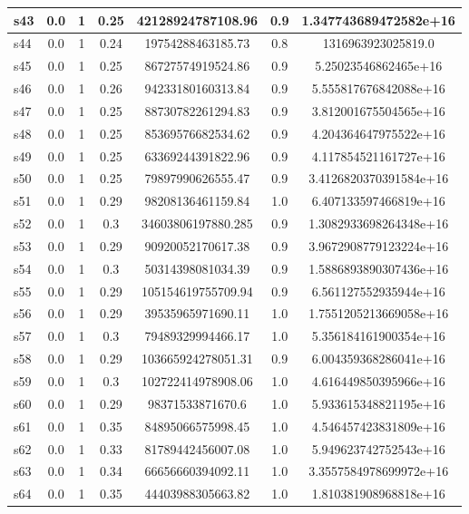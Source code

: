 \documentclass{article}
\begin{document}
\begin{tabular}{|l|c|c|c|c|c|c|}
\hline
s43 &0.0 & 1 & 0.25 & 42128924787108.96 & 0.9 & 1.347743689472582e+16\\
\hline
s44 &0.0 & 1 & 0.24 & 19754288463185.73 & 0.8 & 1316963923025819.0\\
\hline
s45 &0.0 & 1 & 0.25 & 86727574919524.86 & 0.9 & 5.25023546862465e+16\\
\hline
s46 &0.0 & 1 & 0.26 & 94233180160313.84 & 0.9 & 5.555817676842088e+16\\
\hline
s47 &0.0 & 1 & 0.25 & 88730782261294.83 & 0.9 & 3.812001675504565e+16\\
\hline
s48 &0.0 & 1 & 0.25 & 85369576682534.62 & 0.9 & 4.204364647975522e+16\\
\hline
s49 &0.0 & 1 & 0.25 & 63369244391822.96 & 0.9 & 4.117854521161727e+16\\
\hline
s50 &0.0 & 1 & 0.25 & 79897990626555.47 & 0.9 & 3.4126820370391584e+16\\
\hline
s51 &0.0 & 1 & 0.29 & 98208136461159.84 & 1.0 & 6.407133597466819e+16\\
\hline
s52 &0.0 & 1 & 0.3 & 34603806197880.285 & 0.9 & 1.3082933698264348e+16\\
\hline
s53 &0.0 & 1 & 0.29 & 90920052170617.38 & 0.9 & 3.9672908779123224e+16\\
\hline
s54 &0.0 & 1 & 0.3 & 50314398081034.39 & 0.9 & 1.5886893890307436e+16\\
\hline
s55 &0.0 & 1 & 0.29 & 105154619755709.94 & 0.9 & 6.561127552935944e+16\\
\hline
s56 &0.0 & 1 & 0.29 & 39535965971690.11 & 1.0 & 1.7551205213669058e+16\\
\hline
s57 &0.0 & 1 & 0.3 & 79489329994466.17 & 1.0 & 5.356184161900354e+16\\
\hline
s58 &0.0 & 1 & 0.29 & 103665924278051.31 & 0.9 & 6.004359368286041e+16\\
\hline
s59 &0.0 & 1 & 0.3 & 102722414978908.06 & 1.0 & 4.616449850395966e+16\\
\hline
s60 &0.0 & 1 & 0.29 & 98371533871670.6 & 1.0 & 5.933615348821195e+16\\
\hline
s61 &0.0 & 1 & 0.35 & 84895066575998.45 & 1.0 & 4.546457423831809e+16\\
\hline
s62 &0.0 & 1 & 0.33 & 81789442456007.08 & 1.0 & 5.949623742752543e+16\\
\hline
s63 &0.0 & 1 & 0.34 & 66656660394092.11 & 1.0 & 3.3557584978699972e+16\\
\hline
s64 &0.0 & 1 & 0.35 & 44403988305663.82 & 1.0 & 1.810381908968818e+16\\

\end{tabular}
\end{document}
